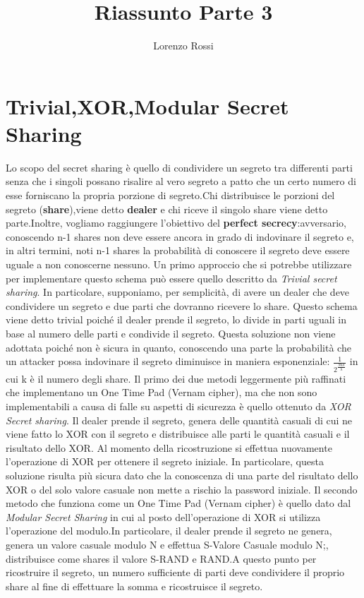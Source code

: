 \documentclass{book}
\title{Riassunto Parte 3}
\author{Lorenzo Rossi}
\begin{document}
\section{Trivial,XOR,Modular Secret Sharing}
Lo scopo del secret sharing è quello di condividere un segreto tra differenti parti senza che i singoli possano risalire al vero segreto a patto che un certo numero di esse forniscano la propria porzione di segreto.Chi distribuisce le porzioni del segreto (\textbf{share}),viene detto \textbf{dealer} e chi riceve il singolo share viene detto parte\@.\newline Inoltre, vogliamo raggiungere l'obiettivo del \textbf{perfect secrecy}:\@un avversario, conoscendo n-1 shares non deve essere ancora in grado di indovinare il segreto e, in altri termini, noti n-1 shares la probabilità di conoscere il segreto deve essere uguale a non conoscerne nessuno\@.\newline
    Un primo approccio che si potrebbe utilizzare per implementare questo schema può essere quello descritto da \emph{Trivial secret sharing}. In particolare, supponiamo, per semplicità, di avere un dealer che deve condividere un segreto e due parti che dovranno ricevere lo share. Questo schema viene detto trivial poiché il dealer prende il segreto, lo divide in parti uguali in base al numero delle parti e condivide il segreto. Questa soluzione non viene adottata poiché non è sicura in quanto, conoscendo una parte la probabilità che un attacker possa indovinare il segreto diminuisce in maniera esponenziale: \(\frac{1}{2^{\frac{Nbit}{h}}}\) in cui k è il numero degli share\@.\newline\smallskip
Il primo dei due metodi leggermente più raffinati che implementano un One Time Pad (Vernam cipher), ma che non sono implementabili a causa di falle su aspetti di sicurezza è quello ottenuto da \emph{XOR Secret sharing}.\newline
Il dealer prende il segreto, genera delle quantità casuali di cui ne viene fatto lo XOR con il segreto e distribuisce alle parti le quantità casuali e il risultato dello XOR\@.
Al momento della ricostruzione si effettua nuovamente l'operazione di XOR per ottenere il segreto iniziale\@.
In particolare, questa soluzione risulta più sicura dato che la conoscenza di una parte del risultato dello XOR o del solo valore casuale non mette a rischio la password iniziale\@.\newline
Il secondo metodo che funziona come un One Time Pad (Vernam cipher) è quello dato dal \emph{Modular Secret Sharing} in cui al posto dell'operazione di XOR si utilizza l'operazione del modulo.In particolare, il dealer prende il segreto ne genera, genera un valore casuale modulo N e effettua S-Valore Casuale modulo N;\@infine, distribuisce come shares il valore S-RAND e RAND.A questo punto per ricostruire il segreto, un numero sufficiente di parti deve condividere il proprio share al fine di effettuare la somma e ricostruisce il segreto.
\end{document}
